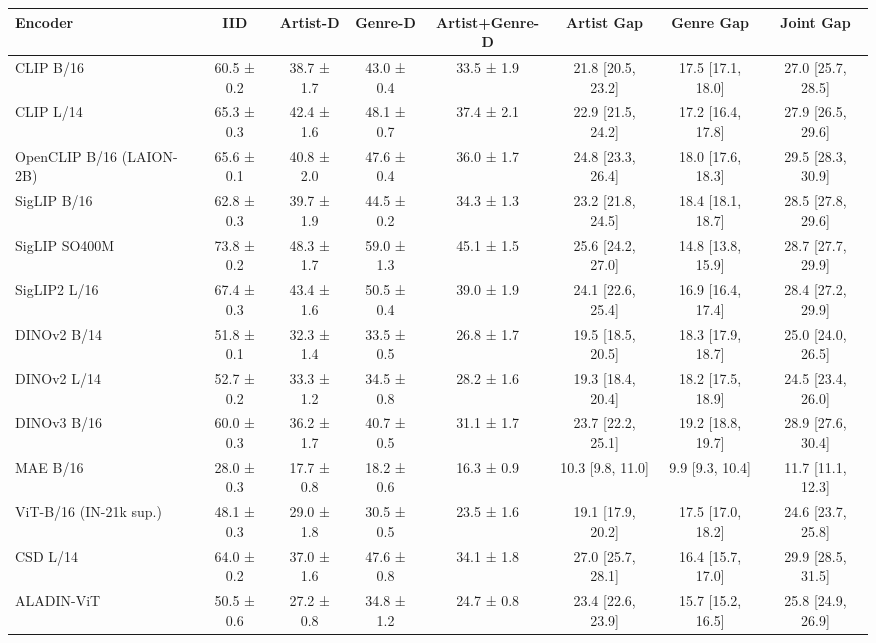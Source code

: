 \begin{tabular}{lccccccc}
\toprule
Encoder & IID & Artist-D & Genre-D & Artist+Genre-D & Artist Gap & Genre Gap & Joint Gap \\
\midrule
CLIP B/16 & 60.5 ± 0.2 & 38.7 ± 1.7 & 43.0 ± 0.4 & 33.5 ± 1.9 & 21.8 [20.5, 23.2] & 17.5 [17.1, 18.0] & 27.0 [25.7, 28.5] \\
CLIP L/14 & 65.3 ± 0.3 & 42.4 ± 1.6 & 48.1 ± 0.7 & 37.4 ± 2.1 & 22.9 [21.5, 24.2] & 17.2 [16.4, 17.8] & 27.9 [26.5, 29.6] \\
OpenCLIP B/16 (LAION-2B) & 65.6 ± 0.1 & 40.8 ± 2.0 & 47.6 ± 0.4 & 36.0 ± 1.7 & 24.8 [23.3, 26.4] & 18.0 [17.6, 18.3] & 29.5 [28.3, 30.9] \\
SigLIP B/16 & 62.8 ± 0.3 & 39.7 ± 1.9 & 44.5 ± 0.2 & 34.3 ± 1.3 & 23.2 [21.8, 24.5] & 18.4 [18.1, 18.7] & 28.5 [27.8, 29.6] \\
SigLIP SO400M & 73.8 ± 0.2 & 48.3 ± 1.7 & 59.0 ± 1.3 & 45.1 ± 1.5 & 25.6 [24.2, 27.0] & 14.8 [13.8, 15.9] & 28.7 [27.7, 29.9] \\
SigLIP2 L/16 & 67.4 ± 0.3 & 43.4 ± 1.6 & 50.5 ± 0.4 & 39.0 ± 1.9 & 24.1 [22.6, 25.4] & 16.9 [16.4, 17.4] & 28.4 [27.2, 29.9] \\
DINOv2 B/14 & 51.8 ± 0.1 & 32.3 ± 1.4 & 33.5 ± 0.5 & 26.8 ± 1.7 & 19.5 [18.5, 20.5] & 18.3 [17.9, 18.7] & 25.0 [24.0, 26.5] \\
DINOv2 L/14 & 52.7 ± 0.2 & 33.3 ± 1.2 & 34.5 ± 0.8 & 28.2 ± 1.6 & 19.3 [18.4, 20.4] & 18.2 [17.5, 18.9] & 24.5 [23.4, 26.0] \\
DINOv3 B/16 & 60.0 ± 0.3 & 36.2 ± 1.7 & 40.7 ± 0.5 & 31.1 ± 1.7 & 23.7 [22.2, 25.1] & 19.2 [18.8, 19.7] & 28.9 [27.6, 30.4] \\
MAE B/16 & 28.0 ± 0.3 & 17.7 ± 0.8 & 18.2 ± 0.6 & 16.3 ± 0.9 & 10.3 [9.8, 11.0] & 9.9 [9.3, 10.4] & 11.7 [11.1, 12.3] \\
ViT-B/16 (IN-21k sup.) & 48.1 ± 0.3 & 29.0 ± 1.8 & 30.5 ± 0.5 & 23.5 ± 1.6 & 19.1 [17.9, 20.2] & 17.5 [17.0, 18.2] & 24.6 [23.7, 25.8] \\
CSD L/14 & 64.0 ± 0.2 & 37.0 ± 1.6 & 47.6 ± 0.8 & 34.1 ± 1.8 & 27.0 [25.7, 28.1] & 16.4 [15.7, 17.0] & 29.9 [28.5, 31.5] \\
ALADIN-ViT & 50.5 ± 0.6 & 27.2 ± 0.8 & 34.8 ± 1.2 & 24.7 ± 0.8 & 23.4 [22.6, 23.9] & 15.7 [15.2, 16.5] & 25.8 [24.9, 26.9] \\
\bottomrule
\end{tabular}
